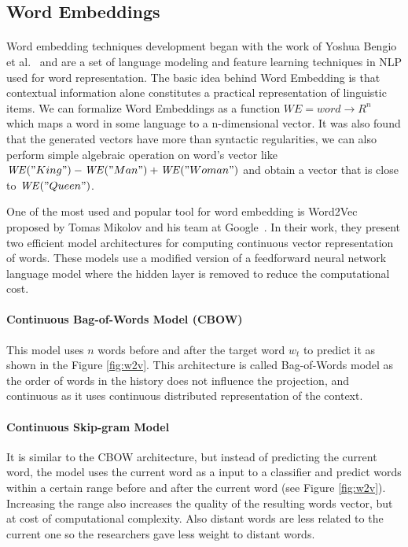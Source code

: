\subsection{Word Embeddings}
\paragraph{}
Word embedding techniques development began with the work of Yoshua Bengio et al.~\cite{bengio2003neural} and are a set of language modeling and feature learning techniques in NLP used for word representation. The basic idea behind Word Embedding is that  contextual information alone constitutes a practical representation of linguistic items. We can formalize Word Embeddings as a function \(\mathit{WE} = word \rightarrow R^n\) which maps a word in some language to a n-dimensional vector. 
It was also found that the generated vectors have more than syntactic regularities, we can also perform simple algebraic operation on word's vector like \(\mathit{WE} ("King")-\mathit{WE}("Man")+\mathit{WE} ("Woman")\) and obtain a vector that is close to \(\mathit{WE}("Queen")\).

One of the most used and popular tool for word embedding is Word2Vec proposed by Tomas Mikolov and his team at Google~\cite{mikolov2013efficient}. In their work, they present two efficient model architectures for computing continuous vector representation of words. These models use a modified version of a feedforward neural network language model where the hidden layer is removed to reduce the computational cost.

\paragraph{Continuous Bag-of-Words Model (CBOW)}
This model uses \(n\) words before and after the target word \(w_t\) to predict it as shown in the Figure \ref{fig:w2v}. This architecture is called Bag-of-Words model as the order of words in the history does not influence the projection, and continuous as it uses continuous distributed representation of the context.


\paragraph{Continuous Skip-gram Model}
It is similar to the CBOW architecture, but instead of predicting the current word, the model uses the current word as a input to a classifier and predict words within a certain range before and after the current word (see Figure \ref{fig:w2v}). Increasing the range also increases the quality of the resulting words vector, but at cost of computational complexity. Also distant words are less related to the current one so the researchers gave less weight to distant words.

